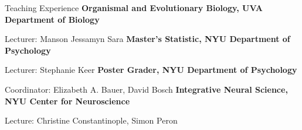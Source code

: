 \begin{rubric}{Teaching Experience}
\textbf{Organismal and Evolutionary Biology, UVA Department of Biology}

Lecturer: Manson Jessamyn Sara
%
\textbf{Master's Statistic, NYU Department of Psychology}

Lecturer: Stephanie Keer
%
\entry*[May 2024]\textbf{Poster Grader, NYU Department of Psychology}

Coordinator: Elizabeth A. Bauer, David Bosch
%
\textbf{Integrative Neural Science, NYU Center for Neuroscience}

Lecture: Christine Constantinople, Simon Peron
  

\end{rubric}
